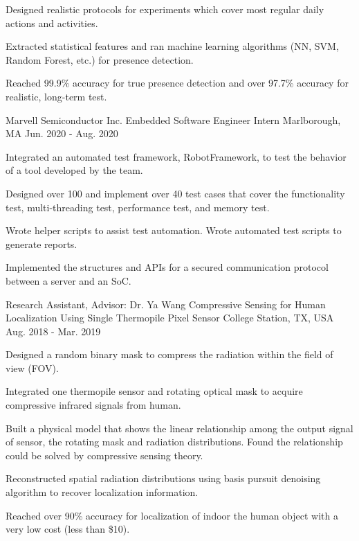\begin{cventries}
{\begin{cvitems}
        \item Designed realistic protocols for experiments which cover most regular daily actions and activities. 
        \item Extracted statistical features and ran machine learning algorithms (NN, SVM, Random Forest, etc.) for presence detection.
        \item Reached 99.9\% accuracy for true presence detection and over 97.7\% accuracy for realistic, long-term test. 
      \end{cvitems}
    }
  \cventry
  {Marvell Semiconductor Inc.} 
  {Embedded Software Engineer Intern} %
  {Marlborough, MA} %
  {Jun. 2020 - Aug. 2020} %
  {
    \begin{cvitems} %
      \item Integrated an automated test framework, RobotFramework, to test the behavior of a tool developed by the team.
      \item Designed over 100 and implement over 40 test cases that cover the functionality test, multi-threading test, performance test, and memory test.
      \item Wrote helper scripts to assist test automation. Wrote automated test scripts to generate reports.
      \item Implemented the structures and APIs for a secured communication protocol between a server and an SoC.
    \end{cvitems}
  }

  

  \cventry
    {Research Assistant, Advisor: Dr. Ya Wang} %
    {Compressive Sensing for Human Localization Using Single Thermopile Pixel Sensor} %
    {College Station, TX, USA} %
    {Aug. 2018 - Mar. 2019} %
    {
      \begin{cvitems} %
        \item Designed a random binary mask to compress the radiation within the field of view (FOV).
        \item Integrated one thermopile sensor and rotating optical mask to acquire compressive infrared signals from human.
        \item Built a physical model that shows the linear relationship among the output signal of sensor, the rotating mask and radiation distributions. Found the relationship could be solved by compressive sensing theory.
        \item Reconstructed spatial radiation distributions using basis pursuit denoising algorithm to recover localization information.
        \item Reached over 90\% accuracy for localization of indoor the human object with a very low cost (less than \$10).
      \end{cvitems}
    }


\end{cventries}
